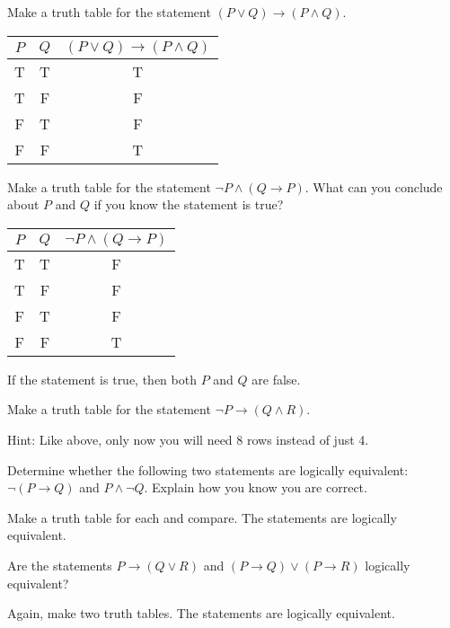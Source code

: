 \documentclass[11pt]{exam}
\def\imp{\rightarrow}
\def\and{\wedge}
\begin{document}
 

\begin{questions}
\question Make a truth table for the statement $(P \vee Q) \imp (P \and Q)$. 

\begin{answer}
  \begin{tabular}{c|c|c}
             $P$ & $Q$ & $(P \vee Q) \imp (P \and Q)$\\ \hline
             T & T & T \\
             T & F & F \\
             F & T & F \\
             F & F & T
          \end{tabular}
\end{answer}


\question Make a truth table for the statement $\neg P \wedge (Q \imp P)$.  What can you conclude about $P$ and $Q$ if you know the statement is true?

\begin{answer}
  \begin{tabular}{c|c|c}
             $P$ & $Q$ & $\neg P \and (Q \imp P)$\\ \hline
             T & T & F \\
             T & F & F \\
             F & T & F \\
             F & F & T
          \end{tabular}
If the statement is true, then both $P$ and $Q$ are false.
\end{answer}


\question Make a truth table for the statement $\neg P \imp (Q \and R)$.

\begin{answer}
  Hint: Like above, only now you will need 8 rows instead of just 4.
\end{answer}


\question Determine whether the following two statements are logically equivalent: $\neg(P \imp Q)$ and $P \and \neg Q$.  Explain how you know you are correct.

\begin{answer}
  Make a truth table for each and compare.  The statements are logically equivalent.
\end{answer}


\question Are the statements $P \imp (Q\vee R)$ and $(P \imp Q) \vee (P \imp R)$ logically equivalent?

\begin{answer}
   Again, make two truth tables.  The statements are logically equivalent.
\end{answer}



\end{questions}
\end{document}
